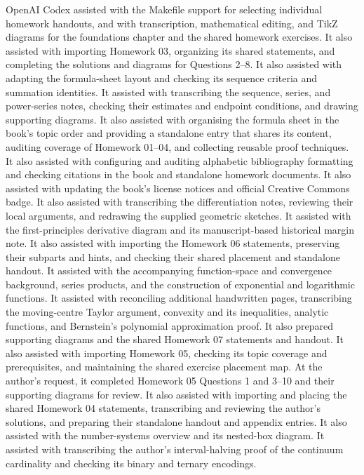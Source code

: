 OpenAI Codex assisted with the Makefile support for selecting individual
homework handouts, and with transcription, mathematical editing, and TikZ
diagrams for the foundations chapter and the shared homework exercises.
It also assisted with importing Homework 03, organizing its shared
statements, and completing the solutions and diagrams for Questions 2--8.
It also assisted with adapting the formula-sheet layout and checking its
sequence criteria and summation identities.
It assisted with transcribing the sequence, series, and power-series
notes, checking their estimates and endpoint conditions, and drawing
supporting diagrams.
It also assisted with organising the formula sheet in the book's topic order
and providing a standalone entry that shares its content, auditing coverage
of Homework 01--04, and collecting reusable proof techniques.
It also assisted with configuring and auditing alphabetic bibliography
formatting and checking citations in the book and standalone homework documents.
It also assisted with updating the book's license notices and official
Creative Commons badge.
It also assisted with transcribing the differentiation notes,
reviewing their local arguments, and redrawing the supplied geometric sketches.
It assisted with the first-principles derivative diagram and its
manuscript-based historical margin note.
It also assisted with importing the Homework 06 statements, preserving their
subparts and hints, and checking their shared placement and standalone handout.
It assisted with the accompanying function-space and convergence background,
series products, and the construction of exponential and logarithmic functions.
It assisted with reconciling additional handwritten pages, transcribing the
moving-centre Taylor argument, convexity and its inequalities, analytic
functions, and Bernstein's polynomial approximation proof. It also prepared
supporting diagrams and the shared Homework 07 statements and handout.
It also assisted with importing Homework 05, checking its topic coverage
and prerequisites, and maintaining the shared exercise placement map.
At the author's request, it completed Homework 05 Questions 1 and 3--10
and their supporting diagrams for review.
It also assisted with importing and placing the shared Homework 04
statements, transcribing and reviewing the author's solutions, and preparing
their standalone handout and appendix entries.
It also assisted with the number-systems overview and its nested-box diagram.
It assisted with transcribing the author's interval-halving proof of the
continuum cardinality and checking its binary and ternary encodings.
